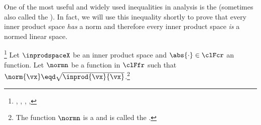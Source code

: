 One of the most useful and widely used inequalities in analysis is the
(sometimes also called the ).
In fact, we will use this inequality shortly to prove that
every inner product space {\em has} a norm
and therefore every inner product space {\em is} a normed linear space.
\begin{theorem}
\footnote{
  ,
  ,
  ,
  ,
  }
\label{thm:cs}
Let $\inprodspaceX$ be an inner product space
and $\abs{\cdot}\in\clFcr$ an  function.
Let $\normn$ be a function in $\clFfr$ such that $\norm{\vx}\eqd\sqrt{\inprod{\vx}{\vx}}$.\footnote{
The function $\normn$ is a  
and is called the  .}
\end{theorem}

